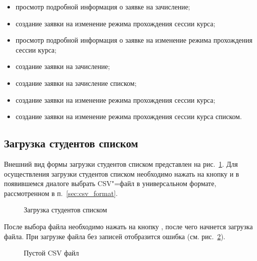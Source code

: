 \begin{itemize}
\begin{itemize}
			\item просмотр подробной информация о заявке на зачисление;
			\item создание заявки на изменение режима прохождения сессии курса;
			\item просмотр подробной информация о заявке на изменение режима прохождения сессии курса;
			\item создание заявки на зачисление;
			\item создание заявки на зачисление списком;
			\item создание заявки на изменение режима прохождения сессии курса;
			\item создание заявки на изменение режима прохождения сессии курса списком.
		\end{itemize}
\end{itemize}


\subsection{Загрузка студентов списком}

Внешний вид формы загрузки студентов списком представлен на рис.~\ref{img:student:mass_invite}. 
Для осуществления загрузки студентов списком необходимо нажать на кнопку  и в появившемся диалоге 
выбрать CSV"=файл в универсальном формате, рассмотренном в п.~\ref{sec:csv_format}. 

\begin{figure}[H]
	\caption{Загрузка студентов списком}
	\label{img:student:mass_invite}
\end{figure}

После выбора файла необходимо нажать на кнопку , после чего начнется загрузка файла.
При загрузке файла без записей отобразится ошибка (см. рис.~\ref{img:student:empty_csv}).
\begin{figure}[H]
	\caption{Пустой CSV файл}
	\label{img:student:empty_csv}
\end{figure}

